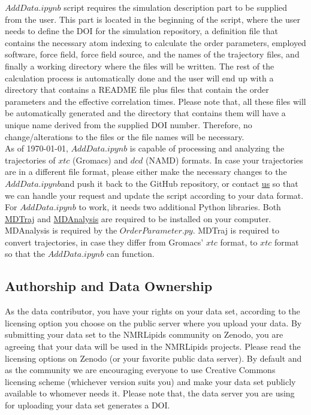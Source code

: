 \documentclass[12pt]{article}
\begin{document}
$AddData.ipynb$ script requires the simulation description part to be supplied from the user. This part is located in the beginning of the script, where the user needs to define the DOI for the simulation repository, a definition file that contains the necessary atom indexing to calculate the order parameters, employed software, force field, force field source, and the names of the trajectory files, and finally a working directory where the files will be written. The rest of the calculation process is automatically done and the user will end up with a directory that contains a README file plus files that contain the order parameters and the effective correlation times. Please note that, all these files will be automatically generated and the directory that contains them will have a unique name derived from the supplied DOI number. Therefore, no change/alterations to the files or the file names will be necessary.\\

As of \today, $AddData.ipynb$ is capable of processing and analyzing the trajectories of $xtc$ (Gromacs) and $dcd$ (NAMD) formats. In case your trajectories are in a different file format, please either make the necessary changes to the $AddData.ipynb$and push it back to the GitHub repository, or contact \href{mailto:b.kav@fz-juelich.de}{us} so that we can handle your request and update the script according to your data format.\\

For $AddData.ipynb$ to work, it needs two additional Python libraries. Both \href{http://mdtraj.org/1.9.3/}{MDTraj} and \href{http://mdanalysis.org}{MDAnalysis} are required to be installed on your computer. MDAnalysis is required by the $OrderParameter.py$. MDTraj is required to convert trajectories, in case they differ from Gromacs' $xtc$ format, to $xtc$ format so that the $AddData.ipynb$ can function. \\

\subsection{Authorship and Data Ownership}

As the data contributor, you have your rights on your data set, according to the licensing option you choose on the public server where you upload your data. By submitting your data set to the NMRLipids community on Zenodo, you are agreeing that your data will be used in the NMRLipids projects. Please read the licensing options on Zenodo (or your favorite public data server). By default and as the community we are encouraging everyone to use Creative Commons licensing scheme (whichever version suits you) and make your data set publicly available to whomever needs it. Please note that, the data server you are using for uploading your data set generates a DOI.\\
\end{document}
